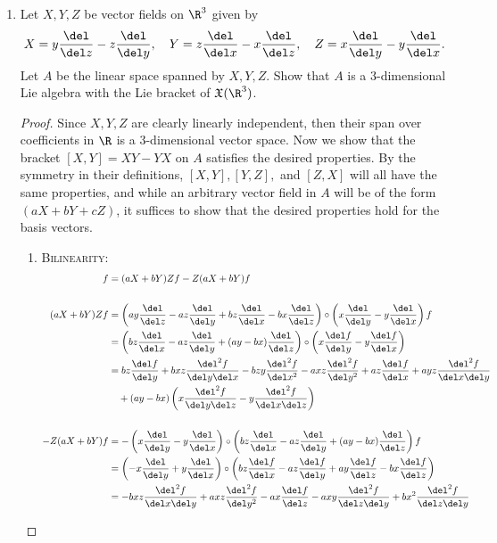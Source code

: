 \documentclass[12pt,letterpaper]{article}
\begin{document}
\begin{enumerate}
\item Let $X,Y,Z$ be vector fields on $\R^3$ given by 
$$X=y\frac{\del}{\del z}-z\frac{\del}{\del y}, \quad 
  Y=z\frac{\del}{\del x}-x\frac{\del}{\del z}, \quad 
  Z=x\frac{\del}{\del y}-y\frac{\del}{\del x}.$$
Let $A$ be the linear space spanned by $X,Y,Z$. Show that $A$ is a 3-dimensional Lie algebra with the Lie bracket of $\mathfrak{X}(\R^3)$. 
\begin{proof}
Since $X,Y,Z$ are clearly linearly independent, then their span over coefficients in $\R$ is a 3-dimensional vector space. Now we show that the bracket $[X,Y]=XY-YX$ on $A$ satisfies the desired properties. By the symmetry in their definitions, $[X,Y], [Y,Z],$ and $[Z,X]$ will all have the same properties, and while an arbitrary vector field in $A$ will be of the form $(aX+bY+cZ)$, it suffices to show that the desired properties hold for the basis vectors. 
	\begin{enumerate}
	\item \textsc{Bilinearity}: 
	\begin{align*}
	[aX+bY,Z]f&=(aX+bY)Zf-Z(aX+bY)f\\
	\\
	(aX+bY)Zf&=\left(ay\frac{\del}{\del z}-az\frac{\del}{\del y}+bz\frac{\del}{\del x}-bx\frac{\del}{\del z} \right) \circ
	  \left(x\frac{\del}{\del y}-y\frac{\del}{\del x}\right)f \\
	&=\left(bz\frac{\del}{\del x} -az\frac{\del}{\del y}+ (ay-bx)\frac{\del}{\del z} \right) \circ	 
	  \left(x\frac{\del f}{\del y}-y\frac{\del f}{\del x}\right)  \\
 	&=bz\frac{\del f}{\del y}+bxz\frac{\del^2f}{\del y\del x}-bzy\frac{\del^2f}{\del x^2}
 	  -axz\frac{\del^2f}{\del y^2}+az\frac{\del f}{\del x}+ayz\frac{\del^2f}{\del x\del y}\\
 	  &\quad +(ay-bx)\left(x\frac{\del^2f}{\del y\del z}-y\frac{\del^2f}{\del x\del z}\right) \\
 	\\ 
 	-Z(aX+bY)f&=
 	  -\left(x\frac{\del }{\del y}-y\frac{\del }{\del x}\right)
 	  \circ \left(bz\frac{\del}{\del x} -az\frac{\del}{\del y}+ (ay-bx)\frac{\del}{\del z} \right)f \\
 	&=\left(-x\frac{\del }{\del y}+y\frac{\del }{\del x}\right)
 	  \circ \left(bz\frac{\del f}{\del x} -az\frac{\del f}{\del y}+ ay\frac{\del f}{\del z}-bx\frac{\del f}{\del z} \right) \\
 	&=-bxz\frac{\del^2f}{\del x\del y}+axz\frac{\del^2f}{\del y^2}-ax\frac{\del f}{\del z}-axy\frac{\del^2f}{\del z\del y}+bx^2\frac{\del^2f}{\del z\del y} \\

\end{align*}
\end{enumerate}
\end{proof}
\end{enumerate}
\end{document}
